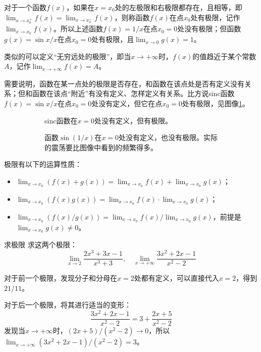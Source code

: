 对于一个函数$f(x)$，如果在$x=x_0$处的左极限和右极限都存在，且相等，即$\lim_{x \to x_0^+} f(x) = \lim_{x \to x_0^-} f(x)$，则称函数$f(x)$在点$x_0$处有极限，记作$\lim_{x \to x_0} f(x)$。所以上述函数$f(x) = 1/x$在点$x_0 = 0$处没有极限；但函数$g(x) = \sin x / x$在点$x_0 = 0$处有极限，且$\lim_{x \to 0} g(x) = 1$。

类似的可以定义“无穷远处的极限”，即当$x \to +\infty$时，$f(x)$的值趋近于某个常数$A$，记作$\lim_{x \to +\infty} f(x) = A$。

需要说明，函数在某一点处的极限是否存在，和函数在该点处是否有定义没有关系；但和函数在该点“附近”有没有定义、怎样定义有关系。比方说sinc函数$f(x) = \sin x / x$在点$x_0 = 0$处没有定义，但它在点$x_0 = 0$处有极限，见图像\cref{fig:sinc}。

\begin{figure}
    \centering
    \begin{subfigure}{0.45\textwidth}
        
        \caption{sinc函数在$x=0$处没有定义，但有极限。}
        \label{fig:sinc}
    \end{subfigure}
    \begin{subfigure}{0.45\textwidth}
        
        \caption{函数$\sin(1/x)$在$x=0$处没有定义，也没有极限。实际的震荡要比图像中看到的频繁得多。}
        \label{fig:sin1x}
    \end{subfigure}
    \caption{}
\end{figure}

极限有以下的运算性质：
\begin{itemize}
    \item $\lim_{x \to x_0} (f(x) + g(x)) = \lim_{x \to x_0} f(x) + \lim_{x \to x_0} g(x)$；
    \item $\lim_{x \to x_0} (f(x)g(x)) = \lim_{x \to x_0} f(x) \cdot \lim_{x \to x_0} g(x)$；
    \item $\lim_{x \to x_0} (f(x)/g(x)) = \lim_{x \to x_0} f(x) / \lim_{x \to x_0} g(x)$，前提是$\lim_{x \to x_0} g(x) \neq 0$。
\end{itemize}

\begin{example}{求极限}{}
    求这两个极限：
    \[ \lim_{x\to 2}\frac{2x^3+3x-1}{x^3+3}, \quad \lim_{x\to +\infty}\frac{3x^2+2x-1}{x^2-2} \]

    \tcblower

    对于前一个极限，发现分子和分母在$x = 2$处都有定义，可以直接代入$x = 2$，得到$21/11$。

    对于后一个极限，将其进行适当的变形：
    \[ \frac{3x^2+2x-1}{x^2-2} = 3+\frac{2x+5}{x^2-2} \]
    发现当$x\to +\infty$时，$(2x+5)/(x^2-2) \to 0$，所以$\lim_{x\to +\infty}(3x^2+2x-1)/(x^2-2) = 3$。
\end{example}


